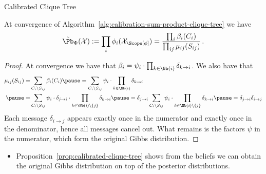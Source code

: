 \begin{frame}{Calibrated Clique Tree}
\begin{proposition}[Unnormalized Gibbs Distribution $=$ Clique/Sepset Beliefs]
    \label{prop:calibrated-clique-tree}
    At convergence of Algorithm~\ref{alg:calibration-sum-product-clique-tree} we have
    \begin{equation}
    \tilde{\Pb}_{\Phi}(\mathcal{X}) := \prod_i \phi_i(\mathcal{X}_{\Scope[\phi]}) = \frac{\prod_{i} \beta_i(C_i)}{\prod_{ij} \mu_{ij}(S_{ij})}\,.
    \end{equation}
\end{proposition}
\pause
    \begin{proof}
        At convergence we have that $\beta_i = \psi_i \cdot \prod_{k \in \Nb(i)} \delta_{k \rightarrow i}$.
\pause
        We also have that
        \begin{equation}
            \begin{aligned}
                \mu_{ij}(S_{ij}) = & \sum_{C_i \backslash S_{ij}} \beta_i(C_i) 
                \pause = \sum_{C_i \backslash S_{ij}} \psi_i \cdot \prod_{k \in \Nb(i)} \delta_{k \rightarrow i} \\
                \pause = & \sum_{C_i \backslash S_{ij}} \psi_i \cdot \delta_{j \rightarrow i} \cdot \prod_{k \in \Nb(i) \backslash \{j\}} \delta_{k \rightarrow i}  
                \pause = \delta_{j \rightarrow i} \sum_{C_i \backslash S_{ij}} \psi_i \cdot \prod_{k \in \Nb(i) \backslash \{j\}} \delta_{k \rightarrow i} 
                \pause = \delta_{j \rightarrow i} \delta_{i \rightarrow j}
            \end{aligned}
        \end{equation}
        \pause
        Each message $\delta_{i \rightarrow j}$ appears exactly once in the numerator and exactly once in the denominator, hence all messages cancel out.
        \pause
        What remains is the factors $\psi$ in the numerator, which form the original Gibbs distribution.
    \end{proof}
    \begin{itemize}
    \item Proposition~\ref{prop:calibrated-clique-tree} shows from the beliefs we can obtain the original Gibbs distribution on top of the posterior distributions.
    \end{itemize}
\end{frame}

